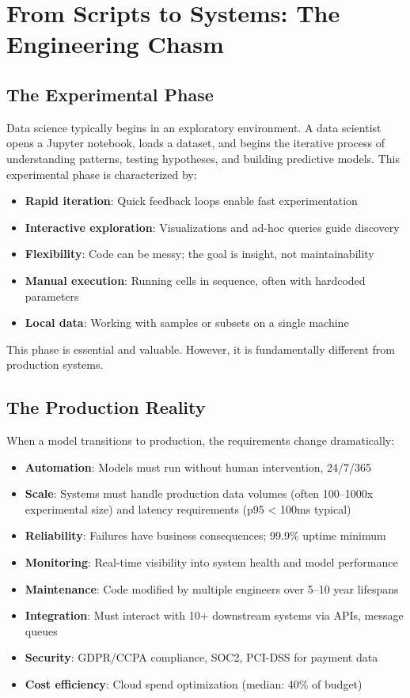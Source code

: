 \section{From Scripts to Systems: The Engineering Chasm}

\subsection{The Experimental Phase}

Data science typically begins in an exploratory environment. A data scientist opens a Jupyter notebook, loads a dataset, and begins the iterative process of understanding patterns, testing hypotheses, and building predictive models. This experimental phase is characterized by:

\begin{itemize}
    \item \textbf{Rapid iteration}: Quick feedback loops enable fast experimentation
    \item \textbf{Interactive exploration}: Visualizations and ad-hoc queries guide discovery
    \item \textbf{Flexibility}: Code can be messy; the goal is insight, not maintainability
    \item \textbf{Manual execution}: Running cells in sequence, often with hardcoded parameters
    \item \textbf{Local data}: Working with samples or subsets on a single machine
\end{itemize}

This phase is essential and valuable. However, it is fundamentally different from production systems.

\subsection{The Production Reality}

When a model transitions to production, the requirements change dramatically:

\begin{itemize}
    \item \textbf{Automation}: Models must run without human intervention, 24/7/365
    \item \textbf{Scale}: Systems must handle production data volumes (often 100--1000x experimental size) and latency requirements (p95 < 100ms typical)
    \item \textbf{Reliability}: Failures have business consequences; 99.9\% uptime minimum
    \item \textbf{Monitoring}: Real-time visibility into system health and model performance
    \item \textbf{Maintenance}: Code modified by multiple engineers over 5--10 year lifespans
    \item \textbf{Integration}: Must interact with 10+ downstream systems via APIs, message queues
    \item \textbf{Security}: GDPR/CCPA compliance, SOC2, PCI-DSS for payment data
    \item \textbf{Cost efficiency}: Cloud spend optimization (median: 40\% of budget)
\end{itemize}

